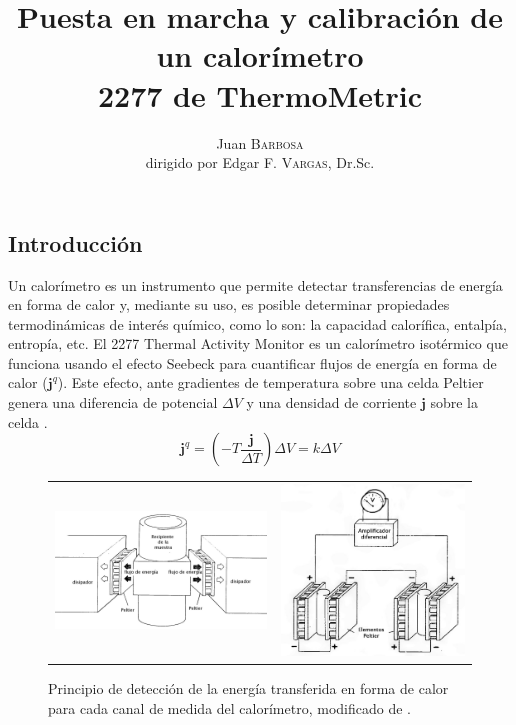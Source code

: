 \documentclass[a0]{sciposter}
\title{Puesta en marcha y calibración de un	calorímetro\\ 2277 de ThermoMetric}
\author{Juan \textsc{Barbosa}\\dirigido por Edgar F. \textsc{Vargas}, Dr.Sc.}
\institute 
{Departamento de Qu\'imica\\
	Universidad de los Andes\\
	Cra 1 N$^\circ$ 18A - 12 Bogotá, Colombia}
\begin{document}
\maketitle

\begin{multicols}{3}

\section{Introducci\'on}
	Un calorímetro es un instrumento que permite detectar transferencias de energ\'ia en forma de calor y, mediante su uso, es posible determinar propiedades termodinámicas de interés químico, como lo son: la capacidad calorífica, entalpía, entropía, etc. El 2277 Thermal Activity Monitor es un calorímetro isotérmico que funciona usando el efecto Seebeck para cuantificar flujos de energía en forma de calor ($\mathbf{j}^q$). Este efecto, ante gradientes de temperatura sobre una celda Peltier genera una diferencia de potencial $\Delta V$ y una densidad de corriente $\mathbf{j}$ sobre la celda \cite{simon2013oxford}.
	\begin{equation}\label{eq: peltier}
		\mathbf{j}^q = \left(-T\dfrac{\mathbf{j}}{\Delta T}\right)\Delta V = k\Delta V
	\end{equation}
	
	\begin{figure}[h]
		\centering
		\begin{tabular}{cc}
			\includegraphics[width=0.59\linewidth]{../Tesis/Figures/heatFlow} & 
			\includegraphics[width=0.39\linewidth]{../Tesis/Figures/twinMeasuring}
		\end{tabular}
		\caption{Principio de detecci\'on de la energ\'ia transferida en forma de calor para cada canal de medida del calor\'imetro, modificado de \cite{Suurkuusk}.}
	\end{figure}


\end{multicols}
\end{document}
